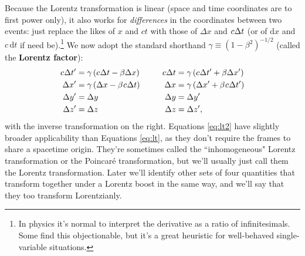 \documentclass[12pt]{article}
\newcommand{\dd}[1]{\mathrm{d}#1}
\begin{document}
Because the Lorentz transformation is linear (space and time coordinates are to first power only), it also works for \emph{differences} in the coordinates between two events: just replace the likes of $x$ and $ct$ with those of $\Delta x$ and $c \mkern.5mu \Delta t$ (or of $\dd x$ and $c \, \dd t$ if need be).\footnote{\label{fn:in}In physics it's normal to interpret the derivative as a ratio of infinitesimals. Some find this objectionable, but it's a great heuristic for well-behaved single-variable situations.} We now adopt the standard shorthand $\gamma \equiv (1 - \beta^2)^{-1/2}$ (called the \textbf{Lorentz factor}):
\begin{equation}\label{eq:lt2}
\begin{aligned}
c \mkern.5mu \Delta t^{\prime} &= \gamma \left( c \mkern.5mu \Delta t - \beta \Delta x \right) & c \mkern.5mu \Delta t &= \gamma \left( c \mkern.5mu \Delta t^\prime + \beta \Delta x^\prime \right) \\
\Delta x^{\prime} &= \gamma \left( \Delta x - \beta \mkern1mu c \mkern.5mu \Delta t \right) & \qquad \Delta x &= \gamma \left( \Delta x^\prime + \beta \mkern1mu c \mkern.5mu \Delta t^\prime \right) \\
\Delta y^{\prime} &= \Delta y& \Delta y&= \Delta y^\prime \\
\Delta z^{\prime} &= \Delta z& \Delta z&= \Delta z^\prime ,
\end{aligned}
\end{equation}
with the inverse transformation on the right. Equations \ref{eq:lt2} have slightly broader applicability than Equations \ref{eq:lt}, as they don't require the frames to share a spacetime origin. They're sometimes called the ``inhomogeneous" Lorentz transformation or the Poincar\'e transformation, but we'll usually just call them the Lorentz transformation. Later we'll identify other sets of four quantities that transform together under a Lorentz boost in the same way, and we'll say that they too transform Lorentzianly.
\end{document}
